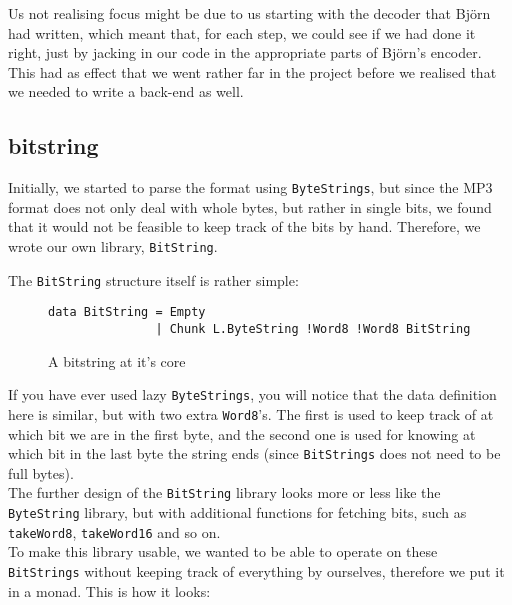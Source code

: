 \documentclass[a4paper,12pt]{article}
\begin{document}
        Us not realising focus might be due to us starting with the decoder that
        Björn had written, which meant that, for each step, we could see if we
        had done it right, just by jacking in our code in the appropriate parts
        of Björn's encoder. This had as effect that we went rather far in the
        project before we realised that we needed to write a back-end as well.

    \subsection{bitstring}
    \label{sec:bitstring}
        Initially, we started to parse the format using \texttt{ByteStrings},
        but since the MP3 format does not only deal with whole bytes, but rather
        in single bits, we found that it would not be feasible to keep track of
        the bits by hand. Therefore, we wrote our own library,
        \texttt{BitString}.

        The \texttt{BitString} structure itself is rather simple:
\begin{figure}[H]
  \begin{center}
        \begin{lstlisting}
data BitString = Empty
               | Chunk L.ByteString !Word8 !Word8 BitString
        \end{lstlisting}
    \caption{A bitstring at it's core}\label{fig:bitstring}
  \end{center}
\end{figure}

        If you have ever used lazy \texttt{ByteStrings}, you will notice that
        the data definition here is similar, but with two extra
        \texttt{Word8}'s. The first is used to keep track of at which bit we are
        in the first byte, and the second one is used for knowing at which bit
        in the last byte the string ends (since \texttt{BitStrings} does not
        need to be full bytes). \\ The further design of the \texttt{BitString}
        library looks more or less like the \texttt{ByteString} library, but
        with additional functions for fetching bits, such as \texttt{takeWord8},
        \texttt{takeWord16} and so on. \\

        To make this library usable, we wanted to be able to operate on these
        \texttt{BitStrings} without keeping track of everything by ourselves,
        therefore we put it in a monad. This is how it looks:
\end{document}
